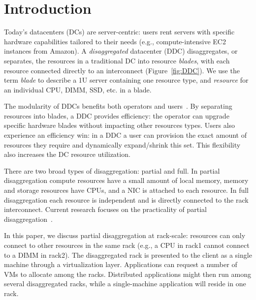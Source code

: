 
\section{Introduction} 
\label{sec:intro}
Today's datacenters (DCs) are server-centric: users rent servers with
specific hardware capabilities tailored to their needs (e.g.,
compute-intensive EC2 instances from Amazon). 
A \emph{disaggregated} datacenter (DDC) disaggregates, or separates,
the resources in a traditional DC into resource \emph{blades},
with each resource connected directly to an interconnect (Figure~\ref{fig:DDC}). 
We use the term \emph{blade} to describe a 1U server containing one resource
type, and \emph{resource} for an individual CPU, DIMM, SSD, etc. in a blade. 


The modularity of DDCs benefits both operators and
users~\cite{Han2013}. By separating resources into blades, a
DDC provides efficiency: the operator can upgrade specific hardware
blades without impacting other resources types. Users also experience
an efficiency win: in a DDC a user can provision the exact amount of
resources they require and dynamically expand/shrink this set. This flexibility
also increases the DC resource utilization.


There are two broad types of disaggregation: partial and full.
In partial disaggregation compute resources have a small amount of
local memory,
memory and storage resources have CPUs,
and a NIC is attached to each resource. 
In full disaggregation each resource is independent and is directly
connected to the rack interconnect. Current research focuses on the practicality
of partial disaggregation~\cite{IntelRSA,Gao2016,Lim2009,Lim2012}.

In this paper, we discuss partial disaggregation at rack-scale:
resources can only connect to other resources in the same rack (e.g., a CPU in
rack1 cannot connect to a DIMM in rack2).
The disaggregated rack is presented to the
client as a single machine through a virtualization layer. Applications can
request a number of VMs to allocate among the racks.
Distributed applications might then run among several disaggregated racks, while
a single-machine application will reside in one rack.


